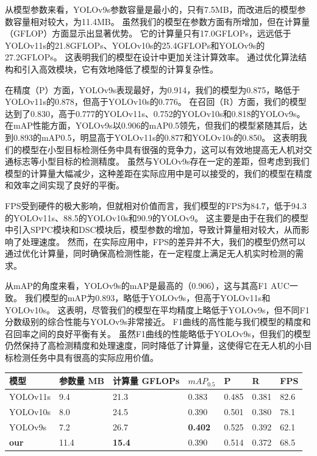 从模型参数来看，YOLOv9s参数容量是最小的，只有7.5MB，而改进后的模型参数容量相对较大，为11.4MB。
虽然我们的模型在参数方面有所增加，但在计算量（GFLOP）方面显示出显著优势。
它的计算量只有17.0GFLOPs，远远低于YOLOv11s的21.8GFLOPs、YOLOv10s的25.4GFLOPs和YOLOv9s的27.2GFLOPs。
这表明我们的模型在设计中更加关注计算效率。
通过优化算法结构和引入高效模块，它有效地降低了模型的计算复杂性。

在精度（P）方面，YOLOv9s表现最好，为0.914，我们的模型为0.875，略低于YOLOv11s的0.878，但高于YOLOv10s的0.776。
在召回（R）方面，我们的模型达到了0.830，高于0.777的YOLOv11s、0.752的YOLOv10s和0.818的YOLOv9s。
在mAP性能方面，YOLOv9s以0.906的mAP0.5领先，但我们的模型紧随其后，达到0.893的mAP0.5，明显高于YOLOv11s的0.877和YOLOv10s的0.850。
这表明我们的模型在小型目标检测任务中具有很强的竞争力，这可以有效地提高无人机对交通标志等小型目标的检测精度。
虽然与YOLOv9s存在一定的差距，但考虑到我们模型的计算量大幅减少，这种差距在实际应用中是可以接受的，我们的模型在精度和效率之间实现了良好的平衡。

FPS受到硬件的极大影响，但就相对价值而言，我们模型的FPS为84.7，低于94.3的YOLOv11s、88.5的YOLOv10s和90.9的YOLOv9。 这主要是由于在我们的模型中引入SPPC模块和DSC模块后，模型参数的增加，导致计算量相对较大，从而影响了处理速度。 然而，在实际应用中，FPS的差异并不大，我们的模型仍然可以通过优化计算量，同时确保高检测性能，在一定程度上满足无人机实时检测的需求。

从mAP的角度来看，YOLOv9s的mAP是最高的（0.906），这与其高F1 AUC一致。 我们模型的mAP为0.893，略低于YOLOv9s，但高于YOLOv11s和YOLOv10s。 这表明，尽管我们的模型在平均精度上略低于YOLOv9s，但不同F1分数级别的综合性能与YOLOv9s非常接近。 F1曲线的高性能与我们模型的精度和召回率之间的良好平衡有关。 虽然F1曲线的性能略低于YOLOv9s，但我们的模型仍然保持了高检测精度和处理速度，同时降低了计算量，这使得它在无人机的小目标检测任务中具有很高的实际应用价值。

\begin{table}[htbp]
    \centering
    \captionsetup{font=footnotesize}
    \label{tab:compare_studies_vd}
    \begin{tabular}{p{}p{}p{}p{}p{}p{}p{}}
        \toprule
        模型       & 参数量 MB & 计算量 GFLOPs & $mAP_{0.5}$   & P     & R     & FPS \\ 
        \midrule
        YOLOv11s     & 9.4   & 21.3         & 0.383           & 0.485  & 0.381 & 82.6 \\
        YOLOv10s     & 8.0   & 24.5         & 0.390           & 0.501  & 0.380 & 78.1 \\
        YOLOv9s      & 7.2   & 26.7         & \textbf{0.402}           & 0.525  & 0.392 & 62.1 \\
        \textbf{our} & 11.4  & \textbf{15.4} & 0.390 & 0.514  & 0.372 & 68.5 \\
        \bottomrule
    \end{tabular}
\end{table}

